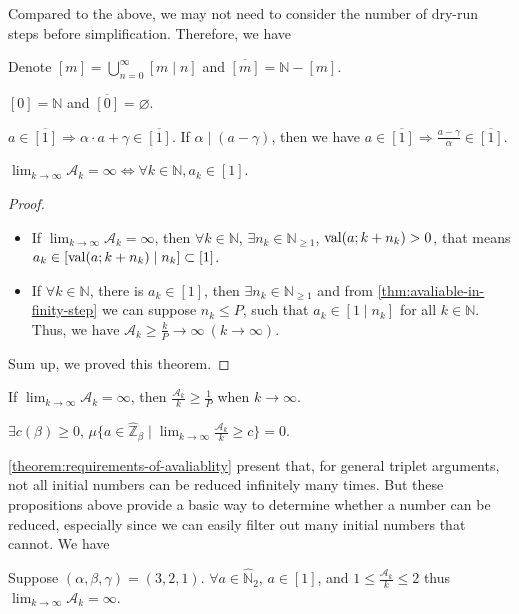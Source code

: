 Compared to the above, we may not need to consider the number of dry-run steps before simplification. Therefore, we have
\begin{definition}
    Denote $[m] = \bigcup_{n=0}^{\infty}[m\mid n]$ and $\overline{[m]} = \mathbb{N} - [m]$.
\end{definition}
\begin{proposition}
    $[0] = \mathbb{N}$ and $\overline{[0]} = \varnothing$.
\end{proposition}
\begin{proposition}
    $a \in \overline{[1]} \Longrightarrow \alpha \cdot a + \gamma \in \overline{[1]}$.
    If $\alpha \mid (a - \gamma)$, then we have $a \in \overline{[1]} \Longrightarrow \frac{a - \gamma}{\alpha} \in \overline{[1]}$.
\end{proposition}
\begin{theorem}\label{theorem:requirements-of-avaliablity}
    $\lim_{k\to\infty} \mathcal{A}_k = \infty\Longleftrightarrow\forall k\in \mathbb{N}, a_k \in [1]$.
\end{theorem}
\begin{proof}
\begin{itemize}
    \item[$\Rightarrow$)]
        If $\lim_{k\to\infty} \mathcal{A}_k = \infty$, then $\forall k \in \mathbb{N}$, $\exists n_{k} \in \mathbb{N}_{\ge1}$, $\operatorname{val}(a;k + n_{k}) > 0$,
        that means $a_{k} \in [\operatorname{val}(a;k + n_{k}) \mid n_{k}] \subset [1]$.
    \item[$\Leftarrow$)] 
        If $\forall k \in \mathbb{N}$, there is $a_k \in [1]$, then $\exists n_{k} \in \mathbb{N}_{\ge1}$ and from \cref{thm:avaliable-in-finity-step} we can suppose $n_k \le P$,
        such that $a_k \in [1 \mid n_{k}]$ for all $k \in \mathbb{N}$.
        Thus, we have $\mathcal{A}_k \ge \frac{k}{P} \to \infty\ (k \to \infty)$.
\end{itemize}
Sum up, we proved this theorem.
\end{proof}
\begin{corollary}
    If $\lim_{k\to\infty}\mathcal{A}_k = \infty$, then $\frac{\mathcal{A}_k}{k} \ge \frac{1}{P}$ when $k\to\infty$.
\end{corollary}
\begin{conjecture}
    $\exists c(\beta) \ge 0$, $\mu\{a \in\widehat{\mathbb{Z}}_{{\beta}} \mid \lim_{k\to\infty}\frac{\mathcal{A}_k}{k} \ge c \}  = 0$.
\end{conjecture}

\cref{theorem:requirements-of-avaliablity} present that, for general triplet arguments, not all initial numbers can be reduced infinitely many times.
But these propositions above provide a basic way to determine whether a number can be reduced, especially since we can easily filter out many initial numbers that cannot. We have
\begin{example}
    Suppose $(\alpha, \beta, \gamma) = (3, 2, 1)$.
    $\forall a \in \widehat{\mathbb{N}}_{2}$, $a\in[1]$, and $1 \le \frac{\mathcal{A}_k}{k} \le 2$ thus $\lim_{k\to\infty}\mathcal{A}_k = \infty$.
\end{example}

